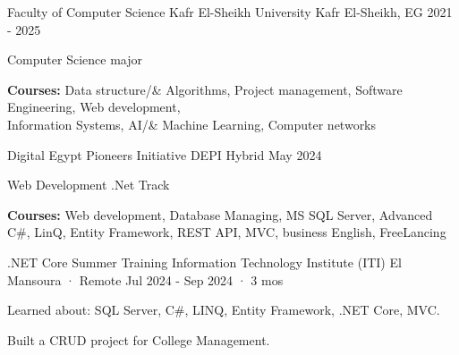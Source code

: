 

\begin{cventries}

  \cventry
    {Faculty of Computer Science} %
    {Kafr El-Sheikh University} %
    {Kafr El-Sheikh, EG} %
    {2021 - 2025} %
    {
      \begin{cvitems} %
        \item {Computer Science major}
        \item {\textbf{Courses:} Data structure/\& Algorithms, Project management, Software Engineering, Web development,\\ Information Systems, AI/\& Machine Learning, Computer networks}
      \end{cvitems}
    }  
     \cventry
    {Digital Egypt Pioneers Initiative} %
    {DEPI} %
    {Hybrid} %
    {May 2024} %
    {
      \begin{cvitems} %
        \item {Web Development .Net Track}
        \item {\textbf{Courses:} Web development, Database Managing, MS SQL Server, Advanced C\#, LinQ, Entity Framework, REST API, MVC, business English, FreeLancing }
      \end{cvitems}
    }  
     \cventry
    {.NET Core Summer Training} %
    {Information Technology Institute (ITI)} %
    {El Mansoura · Remote} %
    {Jul 2024 - Sep 2024 · 3 mos} %
    {
      \begin{cvitems} %
        \item {Learned about: SQL Server, C\#, LINQ, Entity Framework, .NET Core, MVC.}
        \item {Built a CRUD project for College Management.}
      \end{cvitems}
    }  
\end{cventries}
